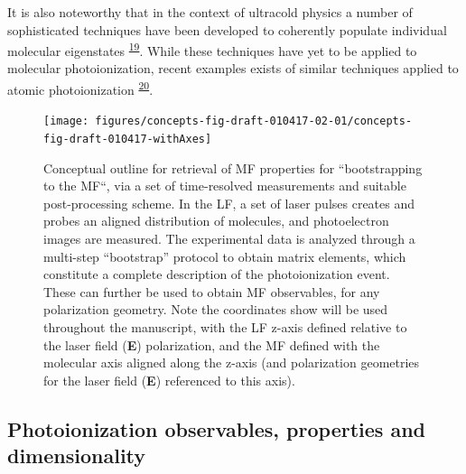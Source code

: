 \documentclass[10pt]{article}
\begin{document}
It is also noteworthy that in the context of ultracold physics a number of sophisticated techniques have been developed to coherently populate individual molecular eigenstates \textsuperscript{\hyperref[csl:19]{19}}. While these techniques have yet to be applied to molecular photoionization, recent examples exists of similar techniques applied to atomic photoionization \textsuperscript{\hyperref[csl:20]{20}}.

\begin{figure}[H]
\begin{center}
\texttt{[image: figures/concepts-fig-draft-010417-02-01/concepts-fig-draft-010417-withAxes]}
\caption{{Conceptual outline for retrieval of MF properties for ``bootstrapping to
the MF``, via a set of time-resolved measurements and suitable
post-processing scheme. In the LF, a set of laser pulses creates and
probes an aligned distribution of molecules, and photoelectron images
are measured. The experimental data is analyzed through a multi-step
``bootstrap'' protocol to obtain matrix elements, which constitute a
complete description of the photoionization event. These can further be
used to obtain MF observables, for any polarization geometry. Note the
coordinates show will be used throughout the manuscript, with the LF
z-axis defined relative to the laser field (\textbf{E}) polarization,
and the MF defined with the molecular axis aligned along the z-axis (and
polarization geometries for the laser field (\textbf{E}) referenced to
this axis).~
{\label{781808}}%
}}
\end{center}
\end{figure}



\subsection{Photoionization observables, properties and dimensionality\label{sec:Photo-into}}
\end{document}
